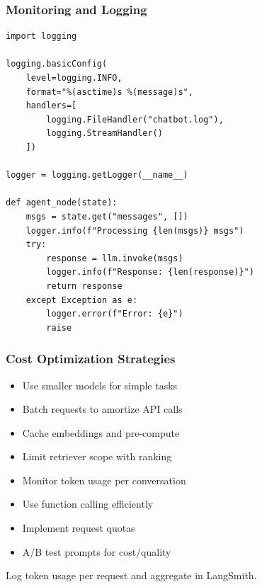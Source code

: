 \documentclass[aspectratio=169,11pt]{beamer}
\begin{document}
\begin{frame}[fragile]
  \frametitle{Monitoring and Logging}

  \begin{lstlisting}
import logging

logging.basicConfig(
    level=logging.INFO,
    format="%(asctime)s %(message)s",
    handlers=[
        logging.FileHandler("chatbot.log"),
        logging.StreamHandler()
    ])

logger = logging.getLogger(__name__)

def agent_node(state):
    msgs = state.get("messages", [])
    logger.info(f"Processing {len(msgs)} msgs")
    try:
        response = llm.invoke(msgs)
        logger.info(f"Response: {len(response)}")
        return response
    except Exception as e:
        logger.error(f"Error: {e}")
        raise
  \end{lstlisting}
\end{frame}

\begin{frame}
  \frametitle{Cost Optimization Strategies}

  \begin{itemize}
    \item Use smaller models for simple tasks
    \item Batch requests to amortize API calls
    \item Cache embeddings and pre-compute
    \item Limit retriever scope with ranking
    \item Monitor token usage per conversation
    \item Use function calling efficiently
    \item Implement request quotas
    \item A/B test prompts for cost/quality
  \end{itemize}

  \begin{tipbox}
    \small Log token usage per request and aggregate in LangSmith.
  \end{tipbox}
\end{frame}
\end{document}
